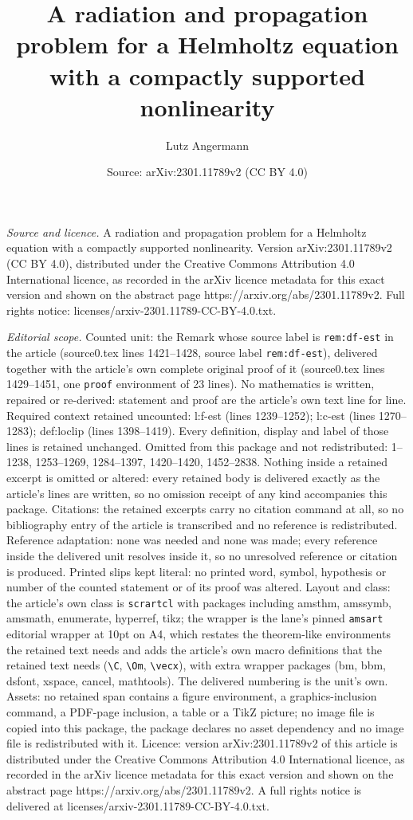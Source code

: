 \documentclass[10pt,a4paper]{amsart}
\title[A radiation and propagation problem for a Helmholtz equation]{A radiation and propagation problem for a Helmholtz equation with a compactly supported nonlinearity}
\author{Lutz Angermann}
\date{Source: arXiv:2301.11789v2 (CC BY 4.0)}
\begin{document}
\maketitle

\noindent\emph{Source and licence.} A radiation and propagation problem for a Helmholtz equation with a compactly supported nonlinearity. Version arXiv:2301.11789v2 (CC BY 4.0), distributed under the Creative Commons Attribution 4.0 International licence, as recorded in the arXiv licence metadata for this exact version and shown on the abstract page https://arxiv.org/abs/2301.11789v2. Full rights notice: licenses/arxiv-2301.11789-CC-BY-4.0.txt.\par\smallskip

\noindent\textit{Editorial scope.} Counted unit: the Remark whose source label is \texttt{rem:df-est} in the article (source0.tex lines 1421--1428, source label \texttt{rem:df-est}), delivered together with the article's own complete original proof of it (source0.tex lines 1429--1451, one \texttt{proof} environment of 23 lines). No mathematics is written, repaired or re-derived: statement and proof are the article's own text line for line. Required context retained uncounted: l:f-est (lines 1239--1252); l:c-est (lines 1270--1283); def:loclip (lines 1398--1419). Every definition, display and label of those lines is retained unchanged. Omitted from this package and not redistributed: 1--1238, 1253--1269, 1284--1397, 1420--1420, 1452--2838. Nothing inside a retained excerpt is omitted or altered: every retained body is delivered exactly as the article's lines are written, so no omission receipt of any kind accompanies this package. Citations: the retained excerpts carry no citation command at all, so no bibliography entry of the article is transcribed and no reference is redistributed. Reference adaptation: none was needed and none was made; every reference inside the delivered unit resolves inside it, so no unresolved reference or citation is produced. Printed slips kept literal: no printed word, symbol, hypothesis or number of the counted statement or of its proof was altered. Layout and class: the article's own class is \texttt{scrartcl} with packages including amsthm, amssymb, amsmath, enumerate, hyperref, tikz; the wrapper is the lane's pinned \texttt{amsart} editorial wrapper at 10pt on A4, which restates the theorem-like environments the retained text needs and adds the article's own macro definitions that the retained text needs (\texttt{\textbackslash C}, \texttt{\textbackslash Om}, \texttt{\textbackslash vecx}), with extra wrapper packages (bm, bbm, dsfont, xspace, cancel, mathtools). The delivered numbering is the unit's own. Assets: no retained span contains a figure environment, a graphics-inclusion command, a PDF-page inclusion, a table or a TikZ picture; no image file is copied into this package, the package declares no asset dependency and no image file is redistributed with it. Licence: version arXiv:2301.11789v2 of this article is distributed under the Creative Commons Attribution 4.0 International licence, as recorded in the arXiv licence metadata for this exact version and shown on the abstract page https://arxiv.org/abs/2301.11789v2. A full rights notice is delivered at licenses/arxiv-2301.11789-CC-BY-4.0.txt. 
\end{document}
